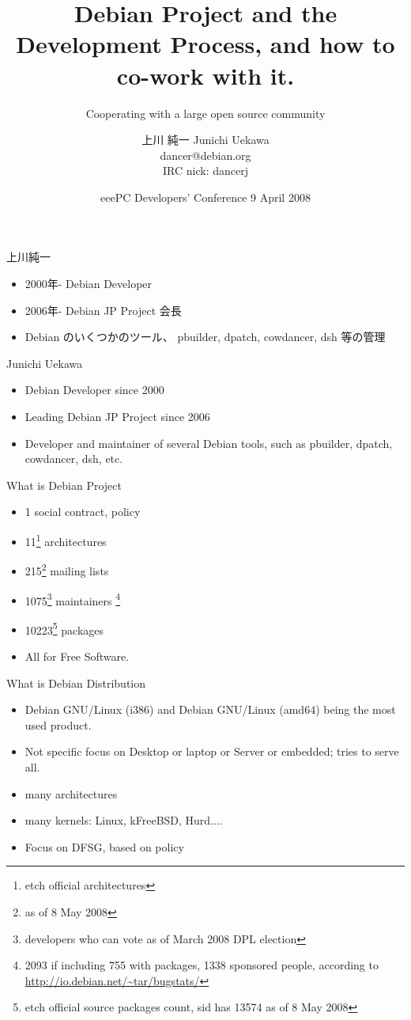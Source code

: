 \documentclass[cjk,dvipdfmx,12pt]{beamer}
\title{Debian Project and the Development Process, and how to co-work
with it.}
\subtitle{Cooperating with a large open source community}
\author{上川 純一 Junichi Uekawa\\dancer@debian.org\\IRC nick: dancerj}
\date{eeePC Developers' Conference 9 April 2008}
\begin{document}
\frame{\titlepage{}}


\begin{frame}{上川純一}
\begin{itemize}
 \item 2000年- Debian Developer
 \item 2006年- Debian JP Project 会長
 \item Debian のいくつかのツール、
       pbuilder, dpatch, cowdancer, dsh 等の管理
\end{itemize}
\end{frame}

\begin{frame}{Junichi Uekawa}
\begin{itemize}
 \item Debian Developer since 2000
 \item Leading Debian JP Project since 2006
 \item Developer and maintainer of several Debian tools, such
       as pbuilder, dpatch, cowdancer, dsh, etc.
\end{itemize}
\end{frame}

\begin{frame}{What is Debian Project}
 \begin{itemize}%
  \item 1 social contract, policy
  \item 11\footnote{etch official architectures} architectures 
  \item 215\footnote{as of 8 May 2008} mailing lists
  \item 1075\footnote{developers who can vote as of March 2008 DPL election}
	maintainers 
	\footnote{2093 if including 755 with packages, 
	1338 sponsored people, according to \url{http://io.debian.net/~tar/bugstats/}}
  \item 10223\footnote{etch official source packages count, sid has 13574 as
	of 8 May 2008} packages
  \item All for Free Software.
 \end{itemize}
\end{frame}

\begin{frame}{What is Debian Distribution}
\begin{itemize}
 \item Debian GNU/Linux (i386) and Debian GNU/Linux (amd64) being the
       most used product.
 \item Not specific focus on Desktop or laptop or Server or embedded; tries to serve all.
 \item many architectures
 \item many kernels: Linux, kFreeBSD, Hurd....
 \item Focus on DFSG, based on policy
\end{itemize}
\end{frame}
\end{document}
